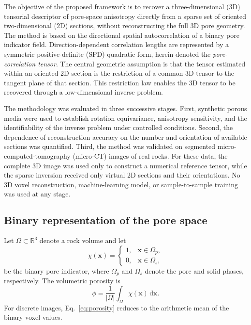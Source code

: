 \documentclass{article}
\begin{document}
The objective of the proposed framework is to recover a three-dimensional
(3D) tensorial descriptor of pore-space anisotropy directly from a sparse set
of oriented two-dimensional (2D) sections, without reconstructing the full
3D pore geometry. The method is based on the directional spatial
autocorrelation of a binary pore indicator field. Direction-dependent
correlation lengths are represented by a symmetric positive-definite (SPD)
quadratic form, herein denoted the \emph{pore-correlation tensor}.
The central geometric assumption is that the tensor estimated within an
oriented 2D section is the restriction of a common 3D tensor to the tangent
plane of that section. This restriction law enables the 3D tensor to be
recovered through a low-dimensional inverse problem.

The methodology was evaluated in three successive stages. First, synthetic
porous media were used to establish rotation equivariance, anisotropy
sensitivity, and the identifiability of the inverse problem under controlled
conditions. Second, the dependence of reconstruction accuracy on the number
and orientation of available sections was quantified. Third, the method was
validated on segmented micro-computed-tomography (micro-CT) images of real
rocks. For these data, the complete 3D image was used only to construct a
numerical reference tensor, while the sparse inversion received only virtual
2D sections and their orientations. No 3D voxel reconstruction,
machine-learning model, or sample-to-sample training was used at any stage.

\subsection{Binary representation of the pore space}
\label{subsec:pore_indicator}

Let $\Omega\subset\mathbb{R}^{3}$ denote a rock volume and let
\begin{equation}
    \chi(\bm{x}) =
    \begin{cases}
        1, & \bm{x}\in\Omega_{p},\\
        0, & \bm{x}\in\Omega_{s},
    \end{cases}
    \label{eq:pore_indicator}
\end{equation}
be the binary pore indicator, where $\Omega_{p}$ and $\Omega_{s}$ denote
the pore and solid phases, respectively. The volumetric porosity is
\begin{equation}
    \phi =
    \frac{1}{|\Omega|}
    \int_{\Omega}\chi(\bm{x})\,\mathrm{d}\bm{x}.
    \label{eq:porosity}
\end{equation}
For discrete images, Eq.~\eqref{eq:porosity} reduces to the arithmetic mean
of the binary voxel values.
\end{document}
